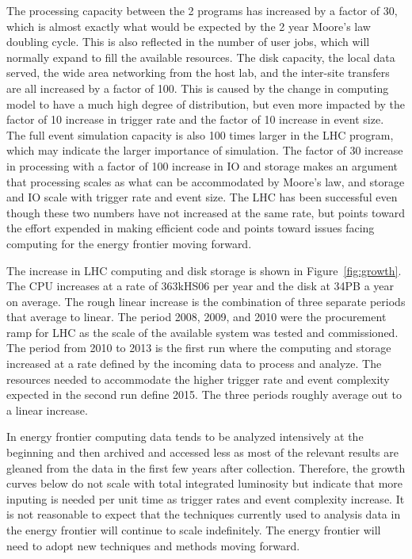 The processing capacity between the 2 programs has increased by a factor of 30, which is almost exactly what 
would be expected by the 2 year Moore's law doubling cycle.    This is also reflected in the number of user 
jobs, which will normally expand to fill the available resources.     The disk capacity, the local data 
served, the wide area networking from the host lab, and the inter-site transfers are all increased by a 
factor of 100.   This is caused by the change in computing model to have a much high degree of 
distribution, but even more impacted by the factor of 10 increase in trigger rate and the factor 
of 10 increase in event size.   The full event simulation capacity is also 100 times larger in the 
LHC program, which may indicate the larger importance of simulation.   The factor of 30 increase in 
processing with a factor of 100 increase in IO and storage makes an argument that processing scales as what can be accommodated by Moore's law, and storage and IO scale with trigger rate and event size.   The LHC has been successful even though these two numbers have not increased at the same rate, but points toward the effort expended in making efficient code and points toward issues facing computing for the energy frontier moving forward.

The increase in LHC computing and disk storage is shown in Figure~\ref{fig:growth}.    The CPU increases at a rate of 363kHS06 per year and the disk at 34PB a year on average.   The rough linear increase is the combination of three separate periods that average to linear.   The period 2008, 2009, and 2010 were the procurement ramp for LHC as the scale of the available system was tested and commissioned.   The period from  2010 to 2013 is the first run where the computing and storage increased at a rate defined by the incoming data to process and analyze.    The resources needed to accommodate the higher trigger rate and event complexity expected in the second run define 2015.  The three periods roughly average out to a linear increase.    

In energy frontier computing data tends to be analyzed intensively at the beginning and then archived and accessed less as most of the relevant results are gleaned from the data in the first few years after collection.   Therefore, the growth curves below do not scale with total integrated luminosity but indicate that more inputing is needed per unit time as trigger rates and event complexity increase.    It is not reasonable to expect that the techniques currently used to analysis data in the energy frontier will continue to scale indefinitely.   The energy frontier will need to adopt new techniques and methods moving forward.

